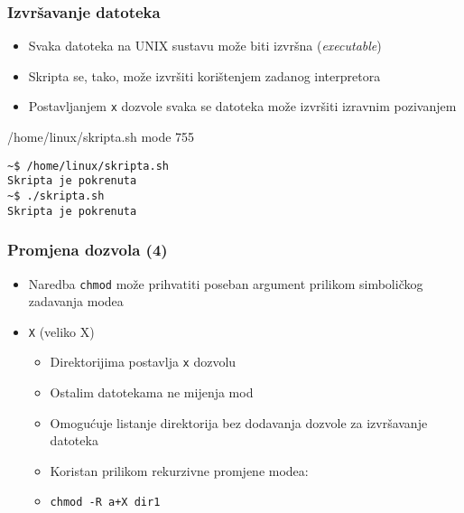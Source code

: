 \documentclass[table,usenames,dvipsnames] {beamer}
\newcommand{\shell}[1]{\texttt{#1}}
\begin{document}
\begin{frame}[fragile]
\frametitle{Izvršavanje datoteka}
\begin{itemize}
  \item Svaka datoteka na UNIX sustavu može biti izvršna (\textit{executable})
  \item Skripta se, tako, može izvršiti korištenjem zadanog interpretora
\end{itemize}
\begin{itemize}
  \item Postavljanjem \shell{x} dozvole svaka se datoteka može izvršiti izravnim pozivanjem
\end{itemize}
\vfill
\begin{block}{/home/linux/skripta.sh \hfill mode 755}
  \makeset
\end{block}
\vfill
\begin{Verbatim}[fontsize=\footnotesize]
~$ /home/linux/skripta.sh
Skripta je pokrenuta
~$ ./skripta.sh
Skripta je pokrenuta
\end{Verbatim}
\end{frame}


\begin{frame}
  \frametitle{Promjena dozvola (4)}
\begin{itemize}
  \item Naredba \shell{chmod} može prihvatiti poseban argument prilikom simboličkog zadavanja modea
\end{itemize}
\begin{itemize}
  \item[] \shell{X} (veliko X)
   \begin{itemize}
    \item Direktorijima postavlja \shell{x} dozvolu
    \item Ostalim datotekama ne mijenja mod
    \item Omogućuje listanje direktorija bez dodavanja dozvole za izvršavanje datoteka
    \item Koristan prilikom rekurzivne promjene modea:
    \item[] \hspace{1em} \shell{chmod -R a+X dir1}
   \end{itemize}
\end{itemize}
\end{frame}
\end{document}
